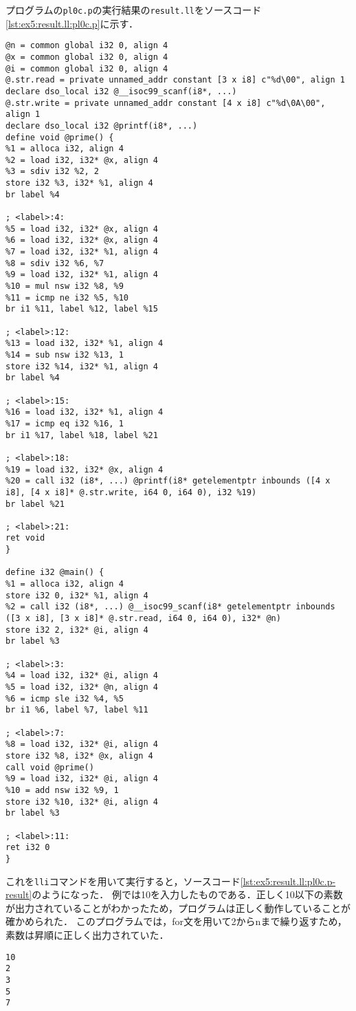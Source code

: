 \documentclass[uplatex]{jsarticle}
\begin{document}
プログラムの\verb#pl0c.p#の実行結果の\verb#result.ll#をソースコード\ref{lst:ex5:result.ll:pl0c.p}に示す．
\begin{lstlisting}[caption=condition句の処理,label=lst:ex5:result.ll:pl0c.p]
@n = common global i32 0, align 4
@x = common global i32 0, align 4
@i = common global i32 0, align 4
@.str.read = private unnamed_addr constant [3 x i8] c"%d\00", align 1
declare dso_local i32 @__isoc99_scanf(i8*, ...)
@.str.write = private unnamed_addr constant [4 x i8] c"%d\0A\00", align 1
declare dso_local i32 @printf(i8*, ...)
define void @prime() {
%1 = alloca i32, align 4
%2 = load i32, i32* @x, align 4
%3 = sdiv i32 %2, 2
store i32 %3, i32* %1, align 4
br label %4

; <label>:4:
%5 = load i32, i32* @x, align 4
%6 = load i32, i32* @x, align 4
%7 = load i32, i32* %1, align 4
%8 = sdiv i32 %6, %7
%9 = load i32, i32* %1, align 4
%10 = mul nsw i32 %8, %9
%11 = icmp ne i32 %5, %10
br i1 %11, label %12, label %15

; <label>:12:
%13 = load i32, i32* %1, align 4
%14 = sub nsw i32 %13, 1
store i32 %14, i32* %1, align 4
br label %4

; <label>:15:
%16 = load i32, i32* %1, align 4
%17 = icmp eq i32 %16, 1
br i1 %17, label %18, label %21

; <label>:18:
%19 = load i32, i32* @x, align 4
%20 = call i32 (i8*, ...) @printf(i8* getelementptr inbounds ([4 x i8], [4 x i8]* @.str.write, i64 0, i64 0), i32 %19)
br label %21

; <label>:21:
ret void
}

define i32 @main() {
%1 = alloca i32, align 4
store i32 0, i32* %1, align 4
%2 = call i32 (i8*, ...) @__isoc99_scanf(i8* getelementptr inbounds ([3 x i8], [3 x i8]* @.str.read, i64 0, i64 0), i32* @n)
store i32 2, i32* @i, align 4
br label %3

; <label>:3:
%4 = load i32, i32* @i, align 4
%5 = load i32, i32* @n, align 4
%6 = icmp sle i32 %4, %5
br i1 %6, label %7, label %11

; <label>:7:
%8 = load i32, i32* @i, align 4
store i32 %8, i32* @x, align 4
call void @prime()
%9 = load i32, i32* @i, align 4
%10 = add nsw i32 %9, 1
store i32 %10, i32* @i, align 4
br label %3

; <label>:11:
ret i32 0
}
\end{lstlisting}
これを\verb#lli#コマンドを用いて実行すると，ソースコード\ref{lst:ex5:result.ll:pl0c.p-result}のようになった．
例では10を入力したものである．正しく10以下の素数が出力されていることがわかったため，プログラムは正しく動作していることが確かめられた．
このプログラムでは，for文を用いて2からnまで繰り返すため，素数は昇順に正しく出力されていた．
\begin{lstlisting}[caption=pl0b.pから出力されたresult.llの実行結果,label=lst:ex5:result.ll:pl0c.p-result]
10
2
3
5
7
\end{lstlisting}
\end{document}
